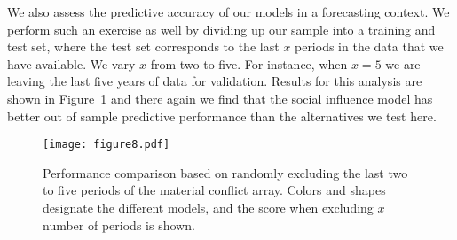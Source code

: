 We also assess the predictive accuracy of our models in a forecasting context. We perform such an exercise as well by dividing up our sample into a training and test set, where the test set corresponds to the last $x$ periods in the data that we have available. We vary $x$ from two to five. For instance, when $x=5$ we are leaving the last five years of data for validation. Results for this analysis are shown in Figure~\ref{fig:predCompareTime} and there again we find that the social influence model has better out of sample predictive performance than the alternatives we test here.

\begin{figure}[ht]
	\centering
	\texttt{[image: figure8.pdf]}
	\caption{Performance comparison based on randomly excluding the last two to five periods of the material conflict array. Colors and shapes designate the different models, and the score when excluding $x$ number of periods is shown.}
	\label{fig:predCompareTime}
	\end{figure}
\FloatBarrier
